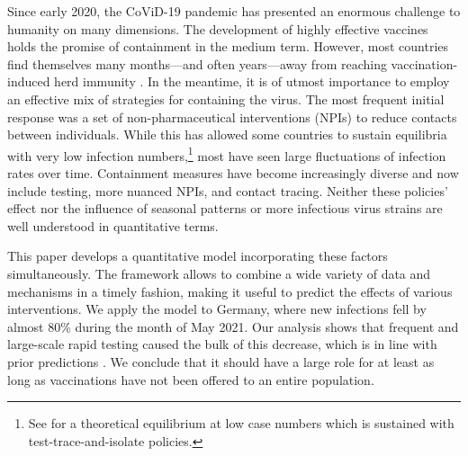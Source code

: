 


Since early 2020, the CoViD-19 pandemic has
presented an enormous challenge to humanity on many dimensions. The development of
highly effective vaccines holds the promise of containment in the medium term. However,
most countries find themselves many months---and often years---away from reaching
vaccination-induced herd immunity \citep{Swaminathan2021}. In the meantime, it is of utmost
importance to employ an effective mix of strategies for containing the virus. The most
frequent initial response was a set of non-pharmaceutical interventions (NPIs) to reduce
contacts between individuals. While this has allowed some countries to sustain
equilibria with very low infection numbers,\footnote{See \citet{Contreras2021} for a
theoretical equilibrium at low case numbers which is sustained with
test-trace-and-isolate policies.} most have seen large fluctuations of infection rates
over time. Containment measures have become increasingly diverse and now include
testing, more nuanced NPIs, and contact tracing. Neither these policies' effect nor the
influence of seasonal patterns or more infectious virus strains are well understood in
quantitative terms.

This paper develops a quantitative model incorporating these factors simultaneously. The
framework allows to combine a wide variety of data and mechanisms in a timely fashion,
making it useful to predict the effects of various interventions. We apply the model to
Germany, where new infections fell by almost 80\% during the month of May 2021. Our
analysis shows that frequent and large-scale rapid testing caused the bulk of this
decrease, which is in line with prior predictions \citep{Mina2021}. We conclude that it
should have a large role for at least as long as vaccinations have not been offered to
an entire population.

